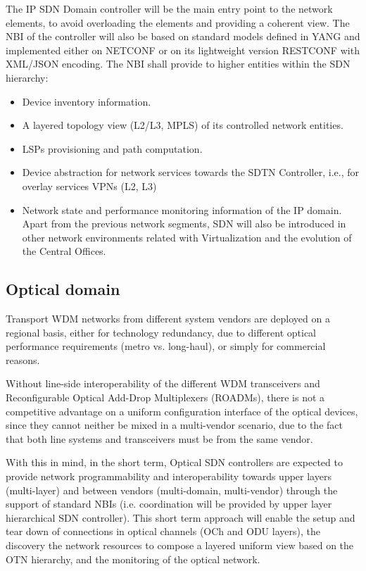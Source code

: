 \documentclass[a4paper,fleqn]{cas-dc}
\begin{document}
The IP SDN Domain controller will be the main entry point to the network elements, to avoid overloading the elements and providing a coherent view. The NBI of the controller will also be based on standard models defined in YANG and implemented either on NETCONF or on its lightweight version RESTCONF \cite{bierman2017restconf} with XML/JSON encoding. The NBI shall provide to higher entities within the SDN hierarchy:
\begin{itemize}
\item Device inventory information.
\item A layered topology view (L2/L3, MPLS) of its controlled network entities.
\item LSPs provisioning and path computation.
\item Device abstraction for network services towards the SDTN Controller, i.e., for overlay services VPNs (L2, L3)
\item Network state and performance monitoring information of the IP domain. 
Apart from the previous network segments, SDN will also be introduced in other network environments related with Virtualization and the evolution of the Central Offices.
\end{itemize}

\subsection{Optical domain}
\label{section:dwdm}
Transport WDM networks from different system vendors are deployed on a regional basis, either for technology redundancy, due to different optical performance requirements (metro vs. long-haul), or simply for commercial reasons. 

Without line-side interoperability of the different WDM transceivers and Reconfigurable Optical Add-Drop Multiplexers (ROADMs), there is not a competitive advantage on a uniform configuration interface of the optical devices, since they cannot neither be mixed in a multi-vendor scenario, due to the fact that both line systems and transceivers must be from the same vendor.

With this in mind, in the short term, Optical SDN controllers are expected to provide network programmability and interoperability towards upper layers (multi-layer) and between vendors (multi-domain, multi-vendor) through the support of standard NBIs (i.e. coordination will be provided by upper layer hierarchical SDN controller). This short term approach will enable the setup and tear down of connections in optical channels (OCh and ODU layers), the discovery the network resources to compose a layered uniform view based on the OTN hierarchy, and the monitoring of the optical network. 
\end{document}
